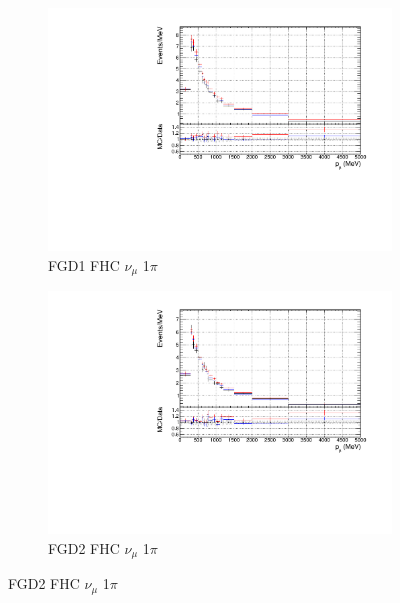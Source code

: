 \begin{figure}[!htbp]
\begin{subfigure}{0.49\textwidth}
  \centering
  \includegraphics[width=\textwidth]{figs/priorpred1D_p_FGD1_numuCC_1pi}
  \caption{FGD1 FHC $\nu_{\mu}$ 1$\pi$}
\end{subfigure}
\begin{subfigure}{0.49\textwidth}
  \centering
  \includegraphics[width=\textwidth]{figs/priorpred1D_p_FGD2_numuCC_1pi}
  \caption{FGD2 FHC $\nu_{\mu}$ 1$\pi$}
\end{subfigure}


\end{figure}
